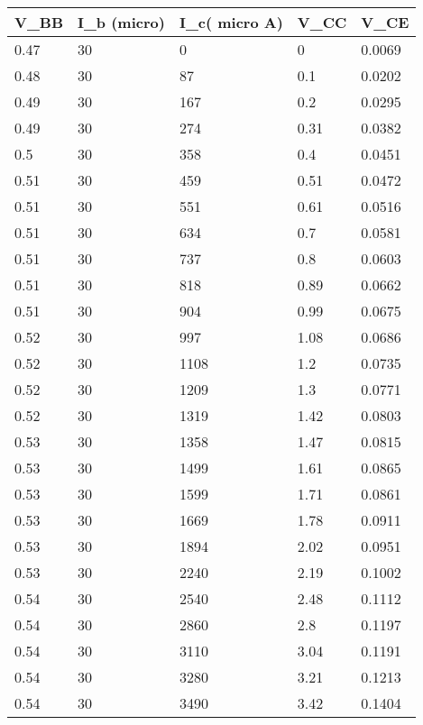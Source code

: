 \documentclass{scrartcl}
\newcommand{\1}{\mathbbm{1}}
\begin{document}
    \begin{table}[!ht]
    \centering
    \begin{tabular}{|l|l|l|l|l|}
    \hline
        \textbf{V\_BB} & \textbf{I\_b (micro)} & \textbf{I\_c( micro A)} & \textbf{V\_CC} & \textbf{V\_CE} \\ \hline
        0.47 & 30 & 0 & 0 & 0.0069 \\ \hline
        0.48 & 30 & 87 & 0.1 & 0.0202 \\ \hline
        0.49 & 30 & 167 & 0.2 & 0.0295 \\ \hline
        0.49 & 30 & 274 & 0.31 & 0.0382 \\ \hline
        0.5 & 30 & 358 & 0.4 & 0.0451 \\ \hline
        0.51 & 30 & 459 & 0.51 & 0.0472 \\ \hline
        0.51 & 30 & 551 & 0.61 & 0.0516 \\ \hline
        0.51 & 30 & 634 & 0.7 & 0.0581 \\ \hline
        0.51 & 30 & 737 & 0.8 & 0.0603 \\ \hline
        0.51 & 30 & 818 & 0.89 & 0.0662 \\ \hline
        0.51 & 30 & 904 & 0.99 & 0.0675 \\ \hline
        0.52 & 30 & 997 & 1.08 & 0.0686 \\ \hline
        0.52 & 30 & 1108 & 1.2 & 0.0735 \\ \hline
        0.52 & 30 & 1209 & 1.3 & 0.0771 \\ \hline
        0.52 & 30 & 1319 & 1.42 & 0.0803 \\ \hline
        0.53 & 30 & 1358 & 1.47 & 0.0815 \\ \hline
        0.53 & 30 & 1499 & 1.61 & 0.0865 \\ \hline
        0.53 & 30 & 1599 & 1.71 & 0.0861 \\ \hline
        0.53 & 30 & 1669 & 1.78 & 0.0911 \\ \hline
        0.53 & 30 & 1894 & 2.02 & 0.0951 \\ \hline
        0.53 & 30 & 2240 & 2.19 & 0.1002 \\ \hline
        0.54 & 30 & 2540 & 2.48 & 0.1112 \\ \hline
        0.54 & 30 & 2860 & 2.8 & 0.1197 \\ \hline
        0.54 & 30 & 3110 & 3.04 & 0.1191 \\ \hline
        0.54 & 30 & 3280 & 3.21 & 0.1213 \\ \hline
        0.54 & 30 & 3490 & 3.42 & 0.1404 \\ \hline

\end{tabular}
\end{table}
\end{document}
